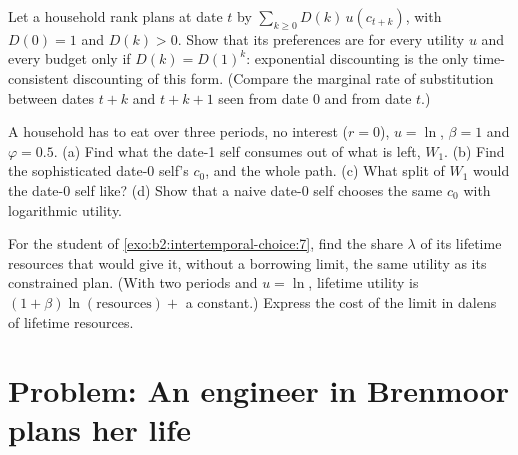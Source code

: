 \begin{exercise}[$\star\star\star$]\label{exo:b2:intertemporal-choice:10}
Let a household rank plans at date $t$ by $\sum_{k\ge 0} D(k)\,u(c_{t+k})$, with $D(0) = 1$ and $D(k) >
0$. Show that its preferences are  for every utility $u$ and every budget only if $D(k)
= D(1)^{k}$: exponential discounting is the only time-consistent discounting of this form. (Compare
the marginal rate of substitution between dates $t + k$ and $t + k + 1$ seen from date 0 and from date
$t$.)
\end{exercise}

\begin{exercise}[$\star\star\star$]\label{exo:b2:intertemporal-choice:11}
A household has  to eat over three periods, no interest ($r = 0$), $u = \ln$, $\beta = 1$
and $\varphi = 0.5$. (a) Find what the date-1 self consumes out of what is left, $W_1$. (b) Find the
sophisticated date-0 self's $c_0$, and the whole path. (c) What split of $W_1$ would the date-0 self
like? (d) Show that a naive date-0 self chooses the same $c_0$ with logarithmic utility.
\end{exercise}

\begin{exercise}[$\star\star\star$]\label{exo:b2:intertemporal-choice:12}
For the student of \cref{exo:b2:intertemporal-choice:7}, find the share $\lambda$ of its lifetime
resources that would give it, without a borrowing limit, the same utility as its constrained plan. (With
two periods and $u = \ln$, lifetime utility is $(1 + \beta)\ln(\text{resources}) + $ a constant.) Express
the cost of the limit in dalens of lifetime resources.
\end{exercise}

\section{Problem: An engineer in Brenmoor plans her life}\label{sec:b2:intertemporal-choice:problem}

